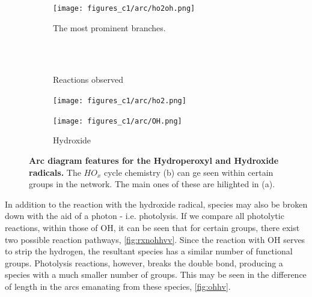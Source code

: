 \begin{figure}[H]
     \centering
      \begin{subfigure}[b]{.4\textwidth}
         \centering
         \texttt{[image: figures\_c1/arc/ho2oh.png]}
         \caption{The most prominent branches. }
         \label{fig:hv}
     \end{subfigure}
      \begin{subfigure}[b]{.4\textwidth}
         \centering
            \\ \ \\
    \hfill
         \caption{Reactions observed}
         \label{fig:rxnho2oh}
     \end{subfigure}
     \begin{subfigure}[b]{.4\textwidth}
         \centering
         \texttt{[image: figures\_c1/arc/ho2.png]}
         \caption{}
         \label{fig:hv}
     \end{subfigure}
     \begin{subfigure}[b]{.4\textwidth}
         \centering
         \texttt{[image: figures\_c1/arc/OH.png]}
         \caption{Hydroxide}
         \label{fig:oh}
     \end{subfigure}
      \caption{\textbf{ Arc diagram features for the Hydroperoxyl and Hydroxide radicals.} The $HO_x$ cycle chemistry (b) can ge seen within certain groups in the network. The main ones of these are hilighted in (a).   }
        \label{fig:ohho2}
\end{figure}


In addition to the reaction with the hydroxide radical, species may also be broken down with the aid of a photon - i.e. photolysis. If we compare all photolytic reactions, within those of OH, it can be seen that for certain groups, there exist two possible reaction pathways, \autoref{fig:rxnohhvv}. Since the reaction with OH serves to strip the hydrogen, the resultant species has a similar number of functional groups. Photolysis reactions, however, breaks the double bond, producing a species with a much smaller number of groups. This may be seen in the difference of length in the arcs emanating from these species, \autoref{fig:ohhv}.




